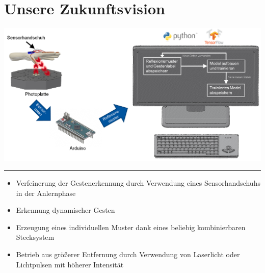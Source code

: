 \documentclass[a4paper,12pt,notumble]{leaflet}
\begin{document}
\noindent
\begin{minipage}[c][0.45\textheight][t]{\textwidth}
	
	\section{Unsere Zukunftsvision}
	
	\centering
	\includegraphics[scale=0.3]{../figures/Anlernphase.png}
	
\end{minipage}

\textcolor{rwth-lblue}{\noindent\rule{\textwidth}{4pt}}

\noindent
\begin{minipage}[c][0.45\textheight][t]{\textwidth}
	\begin{itemize}
		\item Verfeinerung der Gestenerkennung durch Verwendung eines Sensorhandschuhs in der Anlernphase
		\item Erkennung dynamischer Gesten
		\item Erzeugung eines individuellen Muster dank eines beliebig kombinierbaren Stecksystem
		\item Betrieb aus größerer Entfernung durch Verwendung von Laserlicht oder Lichtpulsen mit höherer Intensität
	\end{itemize}
\end{minipage}

\newpage


\end{document}
